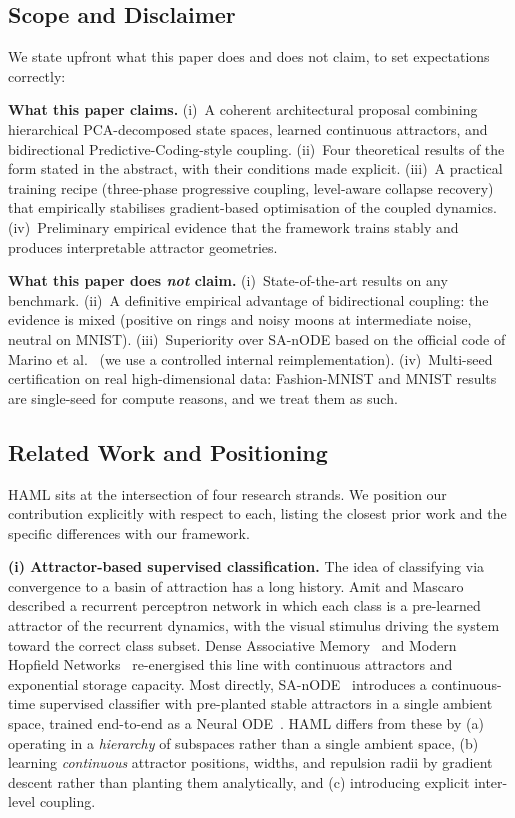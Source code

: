 \documentclass[11pt,a4paper]{article}
\begin{document}
\subsection{Scope and Disclaimer}

We state upfront what this paper does and does not claim, to set expectations correctly:

\textbf{What this paper claims.} (i)~A coherent architectural proposal combining
hierarchical PCA-decomposed state spaces, learned continuous attractors, and bidirectional
Predictive-Coding-style coupling. (ii)~Four theoretical results of the form stated in the
abstract, with their conditions made explicit. (iii)~A practical training recipe
(three-phase progressive coupling, level-aware collapse recovery) that empirically
stabilises gradient-based optimisation of the coupled dynamics. (iv)~Preliminary empirical
evidence that the framework trains stably and produces interpretable attractor geometries.

\textbf{What this paper does \emph{not} claim.} (i)~State-of-the-art results on any
benchmark. (ii)~A definitive empirical advantage of bidirectional coupling: the evidence
is mixed (positive on rings and noisy moons at intermediate noise, neutral on MNIST).
(iii)~Superiority over SA-nODE based on the official code of Marino et al.~\cite{marino2024}
(we use a controlled internal reimplementation). (iv)~Multi-seed certification on real
high-dimensional data: Fashion-MNIST and MNIST results are single-seed for compute
reasons, and we treat them as such.

\subsection{Related Work and Positioning}
\label{sec:related}

HAML sits at the intersection of four research strands. We position our contribution
explicitly with respect to each, listing the closest prior work and the specific
differences with our framework.

\textbf{(i) Attractor-based supervised classification.} The idea of classifying via
convergence to a basin of attraction has a long history. Amit and
Mascaro~\cite{amit2001attractor} described a recurrent perceptron network in which each
class is a pre-learned attractor of the recurrent dynamics, with the visual stimulus
driving the system toward the correct class subset. Dense Associative
Memory~\cite{krotov2016dense} and Modern Hopfield
Networks~\cite{ramsauer2021hopfield} re-energised this line with continuous attractors and
exponential storage capacity. Most directly,
SA-nODE~\cite{marino2024} introduces a continuous-time supervised classifier with
pre-planted stable attractors in a single ambient space, trained end-to-end as a Neural
ODE~\cite{chen2018neural}. HAML differs from these by (a) operating in a
\emph{hierarchy} of subspaces rather than a single ambient space, (b) learning
\emph{continuous} attractor positions, widths, and repulsion radii by gradient descent
rather than planting them analytically, and (c) introducing explicit inter-level
coupling.
\end{document}
